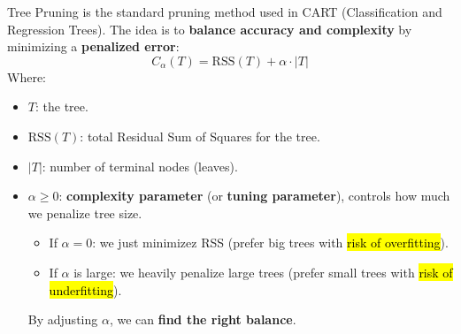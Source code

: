 \highspace
Tree Pruning is the standard pruning method used in CART (Classification and Regression Trees). The idea is to \textbf{balance accuracy and complexity} by minimizing a \textbf{penalized error}:
\begin{equation}
    C_\alpha\left(T\right) = \text{RSS}\left(T\right) + \alpha \cdot \left|T\right|
\end{equation}
Where:
\begin{itemize}
    \item $T$: the tree.
    \item $\text{RSS}(T)$: total Residual Sum of Squares for the tree.
    \item $\left|T\right|$: number of terminal nodes (leaves).
    \item $\alpha \geq 0$: \textbf{complexity parameter} (or \textbf{tuning parameter}), controls how much we penalize tree size.
    \begin{itemize}
        \item If $\alpha = 0$: we just minimizez RSS (prefer big trees with \hl{risk of overfitting}).
        \item If $\alpha$ is large: we heavily penalize large trees (prefer small trees with \hl{risk of underfitting}).
    \end{itemize}
    By adjusting $\alpha$, we can \textbf{find the right balance}.
\end{itemize}